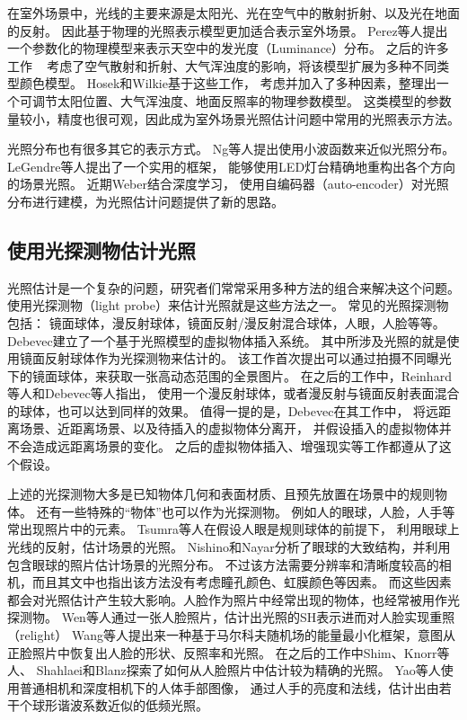 在室外场景中，光线的主要来源是太阳光、光在空气中的散射折射、以及光在地面的反射。
因此基于物理的光照表示模型更加适合表示室外场景。
Perez等人\cite{perez1993all}提出一个参数化的物理模型来表示天空中的发光度（Luminance）分布。
之后的许多工作
~\cite{nishita1996display, sirai1993display, preetham1999practical,raab2008unbiased}
考虑了空气散射和折射、大气浑浊度的影响，将该模型扩展为多种不同类型颜色模型。
Hosek和Wilkie\cite{hosek2012analytic, hovsekhovsek2013adding}基于这些工作，
考虑并加入了多种因素，整理出一个可调节太阳位置、大气浑浊度、地面反照率的物理参数模型。
这类模型的参数量较小，精度也很可观，因此成为室外场景光照估计问题中常用的光照表示方法。

光照分布也有很多其它的表示方式。
Ng等人\cite{ng2003all}提出使用小波函数来近似光照分布。
LeGendre等人\cite{legendre2016practical}提出了一个实用的框架，
能够使用LED灯台精确地重构出各个方向的场景光照。
近期Weber\cite{weber2018learning}结合深度学习，
使用自编码器（auto-encoder）对光照分布进行建模，为光照估计问题提供了新的思路。

\subsection{使用光探测物估计光照} 
光照估计是一个复杂的问题，研究者们常常采用多种方法的组合来解决这个问题。
使用光探测物（light probe）来估计光照就是这些方法之一。
常见的光照探测物包括：
镜面球体，漫反射球体，镜面反射/漫反射混合球体，人眼，人脸等等。
Debevec\cite{debevec1998rendering}建立了一个基于光照模型的虚拟物体插入系统。
其中所涉及光照的就是使用镜面反射球体作为光探测物来估计的。
该工作首次提出可以通过拍摄不同曝光下的镜面球体，来获取一张高动态范围的全景图片。
在之后的工作中，Reinhard等人\cite{reinhard2005high}和Debevec等人\cite{debevec2012single}指出，
使用一个漫反射球体，或者漫反射与镜面反射表面混合的球体，也可以达到同样的效果。 
值得一提的是，Debevec在其工作\cite{debevec1998rendering}中，
将远距离场景、近距离场景、以及待插入的虚拟物体分离开，
并假设插入的虚拟物体并不会造成远距离场景的变化。
之后的虚拟物体插入、增强现实等工作都遵从了这个假设。

上述的光探测物大多是已知物体几何和表面材质、且预先放置在场景中的规则物体。
还有一些特殊的“物体”也可以作为光探测物。
例如人的眼球，人脸，人手等常出现照片中的元素。
Tsumra等人\cite{tsumura2003estimating}在假设人眼是规则球体的前提下，
利用眼球上光线的反射，估计场景的光照。
Nishino和Nayar\cite{nishino2004eyes}分析了眼球的大致结构，并利用包含眼球的照片估计场景的光照分布。
不过该方法需要分辨率和清晰度较高的相机，而且其文中也指出该方法没有考虑瞳孔颜色、虹膜颜色等因素。
而这些因素都会对光照估计产生较大影响。人脸作为照片中经常出现的物体，也经常被用作光探测物。
Wen等人\cite{wen2003face}通过一张人脸照片，估计出光照的SH表示进而对人脸实现重照（relight）
Wang等人\cite{wang2007face}提出来一种基于马尔科夫随机场的能量最小化框架，意图从正脸照片中恢复出人脸的形状、反照率和光照。   
在之后的工作中Shim\cite{shim2012faces}、Knorr等人\cite{knorr2014real}、
Shahlaei和Blanz\cite{shahlaei2015realistic}探索了如何从人脸照片中估计较为精确的光照。
Yao等人\cite{yao2013hand}使用普通相机和深度相机下的人体手部图像，
通过人手的亮度和法线，估计出由若干个球形谐波系数近似的低频光照。


